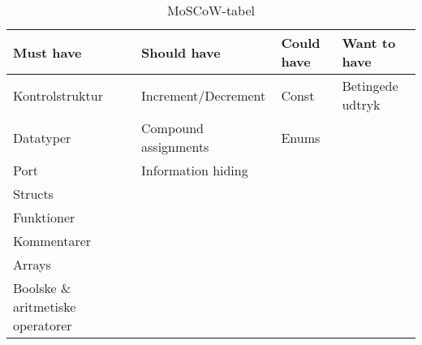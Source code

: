 %
%
\begin{table}[H]
\centering
\begin{tabular}{l|l|l|l}
\toprule
\textbf{Must have} & \textbf{Should have} & \textbf{Could have} & \textbf{Want to have} \\ \midrule
Kontrolstruktur & Increment/Decrement & Const & Betingede udtryk   \\ 
Datatyper & Compound assignments & Enums & \\ 
Port & Information hiding & &	   \\ 
Structs	&  &  &		   \\ 
Funktioner &  &  & 		   \\ 
Kommentarer &  &  & 		   \\ 
Arrays &  &  & 	   \\ 
Boolske \& aritmetiske operatorer &  &  & 		   \\ \bottomrule
 

 

\end{tabular}
\caption{MoSCoW-tabel}
\label{tab:moscow}
\end{table}

